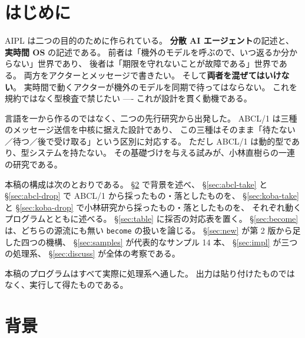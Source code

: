 \documentclass[11pt,a4paper]{ltjsarticle}
\theoremstyle{definition}
\theoremstyle{remark}
\begin{document}
\begin{abstract}
採否の理由はすべて動く最小プログラムで示す。
最新仕様の代表的なサンプル 19 本を、コード・出力・メリット・デメリットとともに解説し、
そのうち 17 本が\textbf{三つの独立な処理系で出力一致}することを確認した
（\texttt{s11} と \texttt{s16} は出力にノード名を含むため自動比較から外し、内容を目視で照合した）。
弾かれるべきプログラムは 30 本になった。
\end{abstract}

\tableofcontents
\newpage

\section{はじめに}
\label{sec:intro}

AIPL は二つの目的のために作られている。
\textbf{分散 AI エージェント}の記述と、\textbf{実時間 OS} の記述である。
前者は「機外のモデルを呼ぶので、いつ返るか分からない」世界であり、
後者は「期限を守れないことが故障である」世界である。
両方をアクターとメッセージで書きたい。
そして\textbf{両者を混ぜてはいけない}。
実時間で動くアクターが機外のモデルを同期で待ってはならない。
これを規約ではなく型検査で禁じたい ---- これが設計を貫く動機である。

言語を一から作るのではなく、二つの先行研究から出発した。
ABCL/1 は三種のメッセージ送信を中核に据えた設計であり、
この三種はそのまま「待たない／待つ／後で受け取る」という区別に対応する。
ただし ABCL/1 は動的型であり、型システムを持たない。
その基礎づけを与える試みが、小林直樹らの一連の研究である。

本稿の構成は次のとおりである。
\S\ref{sec:bg} で背景を述べ、
\S\ref{sec:abcl-take} と \S\ref{sec:abcl-drop} で ABCL/1 から採ったもの・落としたものを、
\S\ref{sec:koba-take} と \S\ref{sec:koba-drop} で小林研究から採ったもの・落としたものを、
それぞれ動くプログラムとともに述べる。
\S\ref{sec:table} に採否の対応表を置く。
\S\ref{sec:become} は、どちらの源流にも無い \texttt{become} の扱いを論じる。
\S\ref{sec:new} が第 2 版から足した四つの機構、
\S\ref{sec:samples} が代表的なサンプル 14 本、
\S\ref{sec:impl} が三つの処理系、
\S\ref{sec:discuss} が全体の考察である。

本稿のプログラムはすべて実際に処理系へ通した。
出力は貼り付けたものではなく、実行して得たものである。

\section{背景}
\label{sec:bg}
\end{document}

